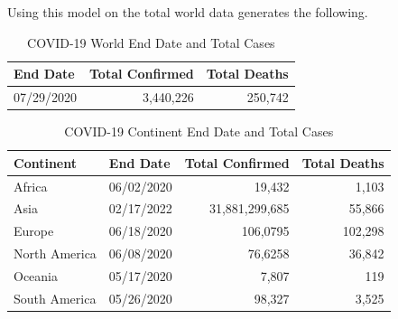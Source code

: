 \documentclass{homework}
\begin{document}
Using this model on the total world data generates the following.

\begin{table}[H]
  \caption{COVID-19 World End Date and Total Cases}
  \label{Task 2 Results World}
  \centering
  \begin{tabular}{lrr}
    \toprule
    End Date   & Total Confirmed & Total Deaths \\
    \midrule
    07/29/2020 & 3,440,226       & 250,742      \\
    \bottomrule
  \end{tabular}
\end{table}

\begin{table}[H]
  \caption{COVID-19 Continent End Date and Total Cases}
  \label{Task 2 Results Continent}
  \centering
  \begin{tabular}{llrr}
    \toprule
    Continent     & End Date   & Total Confirmed & Total Deaths \\
    \midrule
    Africa        & 06/02/2020 & 19,432           & 1,103        \\
    Asia          & 02/17/2022 & 31,881,299,685  & 55,866       \\
    Europe        & 06/18/2020 & 106,0795        & 102,298      \\
    North America & 06/08/2020 & 76,6258         & 36,842       \\
    Oceania       & 05/17/2020 & 7,807           & 119          \\
    South America & 05/26/2020 & 98,327          & 3,525        \\
    \bottomrule
  \end{tabular}

\end{table}

\newpage
\end{document}
